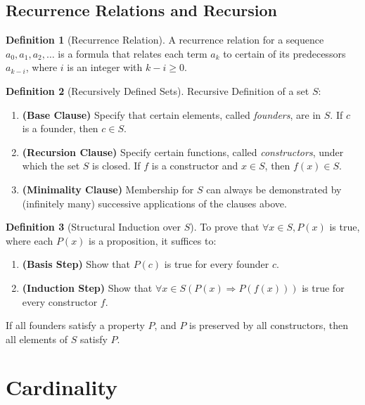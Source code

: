 \documentclass{article}
\theoremstyle{plain}
\theoremstyle{definition}
\newtheorem*{definition}{Definition}
\theoremstyle{remark}
\begin{document}
\subsection{Recurrence Relations and Recursion}

\begin{definition}[Recurrence Relation]
    A recurrence relation for a sequence $a_0, a_1, a_2, \dots$ is a formula that relates each term $a_k$ to certain of its predecessors $a_{k-i}$, where $i$ is an integer with $k-i \geq 0$.
\end{definition}

\begin{definition}[Recursively Defined Sets]
    Recursive Definition of a set $S$:
    \begin{enumerate}
        \item \textbf{(Base Clause)} Specify that certain elements, called \textit{founders}, are in $S$. If $c$ is a founder, then $c \in S$.
        \item \textbf{(Recursion Clause)} Specify certain functions, called \textit{constructors}, under which the set $S$ is closed. If $f$ is a constructor and $x \in S$, then $f(x) \in S$.
        \item \textbf{(Minimality Clause)} Membership for $S$ can always be demonstrated by (infinitely many) successive applications of the clauses above.
    \end{enumerate}
\end{definition}

\begin{definition}[Structural Induction over $S$]
    To prove that $\forall x \in S, P(x)$ is true, where each $P(x)$ is a proposition, it suffices to:
    \begin{enumerate}
        \item \textbf{(Basis Step)} Show that $P(c)$ is true for every founder $c$.
        \item \textbf{(Induction Step)} Show that $\forall x \in S (P(x) \Rightarrow P(f(x)))$ is true for every constructor $f$.
    \end{enumerate}
    If all founders satisfy a property $P$, and $P$ is preserved by all constructors, then all elements of $S$ satisfy $P$.
\end{definition}

\section{Cardinality}
\end{document}
